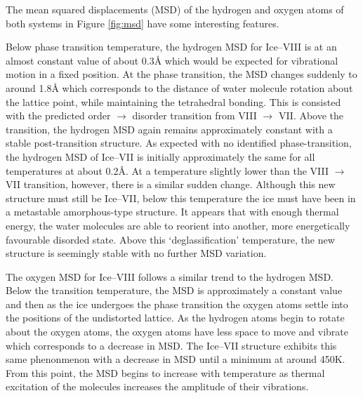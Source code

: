 \par 
The mean squared displacements (MSD) of the hydrogen and oxygen atoms of both systems in Figure \ref{fig:msd}
have some interesting features.

\par
Below phase transition temperature, the hydrogen MSD for Ice--VIII is at an almost constant value
of about 0.3\AA{} which would be expected for vibrational motion in a fixed position.
At the phase transition, the MSD changes suddenly to around 1.8\AA{} which corresponds to the
distance of water molecule rotation about the lattice point, while maintaining the tetrahedral
bonding.
This is consisted with the predicted order $\to$ disorder transition from VIII $\to$ VII.
Above the transition, the hydrogen MSD again remains approximately constant with a stable post-transition
structure.
As expected with no identified phase-transition, the hydrogen MSD of Ice--VII is initially approximately 
the same for all temperatures at about 0.2\AA{}. 
At a temperature slightly lower than the VIII $\to$ VII transition, however, there is a similar sudden 
change.
Although this new structure must still be Ice--VII, below this temperature the ice must have been in a metastable
amorphous-type structure.
It appears that with enough thermal energy, the water molecules are able to reorient into another, more energetically 
favourable disorded state.
Above this `deglassification' temperature, the new structure is seemingly stable with no further MSD variation.

\par
The oxygen MSD for Ice--VIII follows a similar trend to the hydrogen MSD. 
Below the transition temperature, the MSD is approximately a constant value and then as the ice undergoes
the phase transition the oxygen atoms settle into the positions of the undistorted lattice.
As the hydrogen atoms begin to rotate about the oxygen atoms, the oxygen atoms have less space to move
and vibrate which corresponds to a decrease in MSD.
The Ice--VII structure exhibits this same phenonmenon with a decrease in MSD until a minimum at
around 450K.
From this point, the MSD begins to increase with temperature as thermal excitation of the molecules increases
the amplitude of their vibrations.

